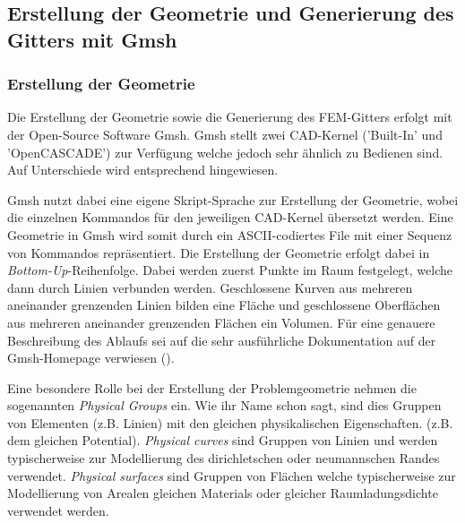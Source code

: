\subsection{Erstellung der Geometrie und Generierung des Gitters mit Gmsh}
\subsubsection{Erstellung der Geometrie}
Die Erstellung der Geometrie sowie die Generierung des FEM-Gitters erfolgt mit der Open-Source Software Gmsh. \cite{gmsh_website}
Gmsh stellt zwei CAD-Kernel ('Built-In' und 'OpenCASCADE') zur Verfügung welche jedoch sehr ähnlich zu Bedienen sind. Auf Unterschiede wird entsprechend hingewiesen.\newline

Gmsh nutzt dabei eine eigene Skript-Sprache zur Erstellung der Geometrie, wobei die einzelnen Kommandos für den jeweiligen CAD-Kernel übersetzt werden. Eine Geometrie in Gmsh wird somit durch ein ASCII-codiertes File mit einer Sequenz von Kommandos repräsentiert. Die Erstellung der Geometrie erfolgt dabei in \textit{Bottom-Up}-Reihenfolge. Dabei werden zuerst Punkte im Raum festgelegt, welche dann durch Linien verbunden werden. Geschlossene Kurven aus mehreren aneinander grenzenden Linien bilden eine Fläche und geschlossene Oberflächen aus mehreren aneinander grenzenden Flächen ein Volumen. Für eine genauere Beschreibung des Ablaufs sei auf die sehr ausführliche Dokumentation auf der Gmsh-Homepage verwiesen (\cite{gmsh_website}).\newline

Eine besondere Rolle bei der Erstellung der Problemgeometrie nehmen die sogenannten \textit{Physical Groups} ein. Wie ihr Name schon sagt, sind dies Gruppen von Elementen (z.B. Linien) mit den gleichen physikalischen Eigenschaften. (z.B. dem gleichen Potential). \textit{Physical curves} sind Gruppen von Linien und werden typischerweise zur Modellierung des dirichletschen oder neumannschen Randes verwendet. \textit{Physical surfaces} sind Gruppen von Flächen welche typischerweise zur Modellierung von Arealen gleichen Materials oder gleicher Raumladungsdichte verwendet werden.
 
